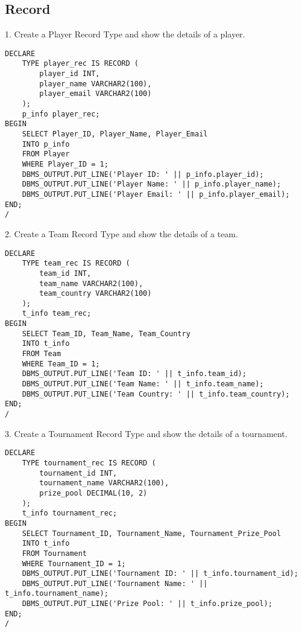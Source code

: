 \clearpage
\subsection{Record}
\hrulefill

1. Create a  Player Record Type and  show the details of a player.

\begin{lstlisting}[caption={ Query 1},label={lst:q-1}]
    DECLARE
    TYPE player_rec IS RECORD (
        player_id INT,
        player_name VARCHAR2(100),
        player_email VARCHAR2(100)
    );
    p_info player_rec;
BEGIN
    SELECT Player_ID, Player_Name, Player_Email
    INTO p_info
    FROM Player
    WHERE Player_ID = 1;
    DBMS_OUTPUT.PUT_LINE('Player ID: ' || p_info.player_id);
    DBMS_OUTPUT.PUT_LINE('Player Name: ' || p_info.player_name);
    DBMS_OUTPUT.PUT_LINE('Player Email: ' || p_info.player_email);
END;
/
\end{lstlisting}


2. Create a Team Record Type and show the details of a team.
\begin{lstlisting}[caption={ Query 2},label={lst:q-2}]
    DECLARE
    TYPE team_rec IS RECORD (
        team_id INT,
        team_name VARCHAR2(100),
        team_country VARCHAR2(100)
    );
    t_info team_rec;
BEGIN
    SELECT Team_ID, Team_Name, Team_Country
    INTO t_info
    FROM Team
    WHERE Team_ID = 1;
    DBMS_OUTPUT.PUT_LINE('Team ID: ' || t_info.team_id);
    DBMS_OUTPUT.PUT_LINE('Team Name: ' || t_info.team_name);
    DBMS_OUTPUT.PUT_LINE('Team Country: ' || t_info.team_country);
END;
/

\end{lstlisting}

3. Create a Tournament Record Type and show the details of a tournament.

\begin{lstlisting}[caption={ Query 3},label={lst:q-3}]
    DECLARE
    TYPE tournament_rec IS RECORD (
        tournament_id INT,
        tournament_name VARCHAR2(100),
        prize_pool DECIMAL(10, 2)
    );
    t_info tournament_rec;
BEGIN
    SELECT Tournament_ID, Tournament_Name, Tournament_Prize_Pool
    INTO t_info
    FROM Tournament
    WHERE Tournament_ID = 1;
    DBMS_OUTPUT.PUT_LINE('Tournament ID: ' || t_info.tournament_id);
    DBMS_OUTPUT.PUT_LINE('Tournament Name: ' || t_info.tournament_name);
    DBMS_OUTPUT.PUT_LINE('Prize Pool: ' || t_info.prize_pool);
END;
/
\end{lstlisting}